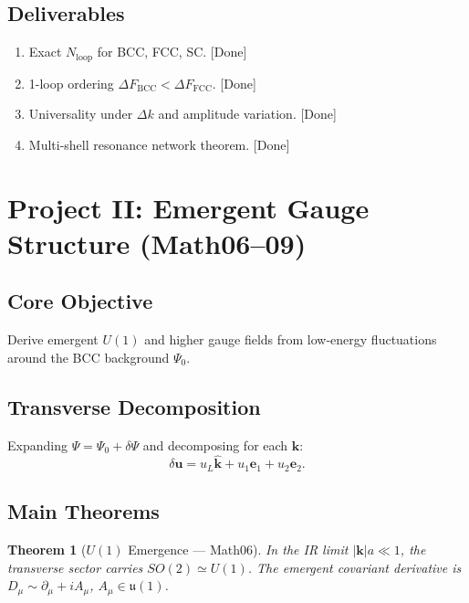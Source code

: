 \documentclass[11pt,a4paper]{article}
\newcommand{\Nloop}{N_{\mathrm{loop}}}
\newcommand{\Dmu}{D_{\mu}}
\newtheorem{theorem}{Theorem}[section]
\begin{document}
\subsection{Deliverables}
\begin{enumerate}
\item Exact $\Nloop$ for BCC, FCC, SC. \hfill\textcolor{green!55!black}{[Done]}
\item 1-loop ordering $\Delta F_{\mathrm{BCC}}<\Delta F_{\mathrm{FCC}}$. \hfill\textcolor{green!55!black}{[Done]}
\item Universality under $\Delta k$ and amplitude variation. \hfill\textcolor{green!55!black}{[Done]}
\item Multi-shell resonance network theorem. \hfill\textcolor{green!55!black}{[Done]}
\end{enumerate}

\section{Project II: Emergent Gauge Structure (Math06--09)}

\subsection{Core Objective}
Derive emergent $U(1)$ and higher gauge fields from low-energy fluctuations
around the BCC background $\Psi_{0}$.

\subsection{Transverse Decomposition}
Expanding $\Psi=\Psi_{0}+\delta\Psi$ and decomposing for each $\mathbf{k}$:
\begin{equation}
\delta\mathbf{u}=u_{L}\hat{\mathbf{k}}+u_{1}\mathbf{e}_{1}+u_{2}\mathbf{e}_{2}.
\end{equation}

\subsection{Main Theorems}
\begin{theorem}[$U(1)$ Emergence --- Math06]
In the IR limit $|\mathbf{k}|a\ll1$, the transverse sector carries
$SO(2)\simeq U(1)$. The emergent covariant derivative is
$\Dmu\sim\partial_{\mu}+iA_{\mu}$, $A_{\mu}\in\mathfrak{u}(1)$.
\end{theorem}
\end{document}
